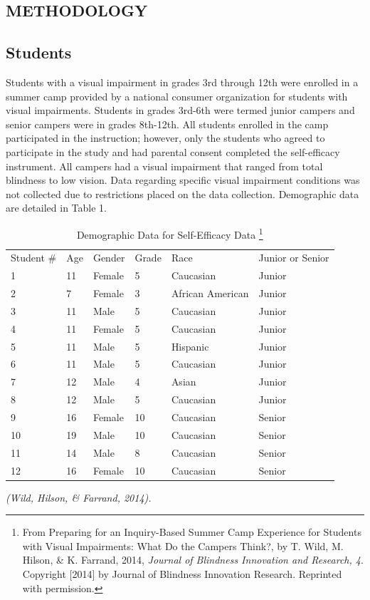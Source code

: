 \documentclass[11.5pt]{sig-alternate} %
\begin{document}
\begin{large}
\section*{METHODOLOGY}

\subsection*{Students}

Students with a visual impairment in grades 3rd through 12th were enrolled in a summer camp provided by a national consumer organization for students with visual impairments. Students in grades 3rd-6th were termed junior campers and senior campers were in grades 8th-12th. All students enrolled in the camp participated in the instruction; however, only the students who agreed to participate in the study and had parental consent completed the self-efficacy instrument. All campers had a visual impairment that ranged from total blindness to low vision.  Data regarding specific visual impairment conditions was not collected due to restrictions placed on the data collection. Demographic data are detailed in Table 1. 

\begin{table}[thp]
\caption{Demographic Data for Self-Efficacy Data \footnote{From Preparing for an Inquiry-Based Summer Camp Experience for Students with Visual Impairments: What Do the Campers Think?, by T. Wild, M. Hilson, \& K. Farrand, 2014, \textit{Journal of Blindness Innovation and Research, 4}.  Copyright [2014] by Journal of Blindness Innovation Research. Reprinted with permission.}}
\begin{tabular}{llllll}
\hline
Student \# & Age & Gender & Grade & Race & Junior or Senior \\
1 & 11 & Female & 5 & Caucasian & Junior \\
2 & 7 & Female & 3 & African American & Junior \\
3 & 11 & Male & 5 & Caucasian & Junior \\
4 & 11 & Female & 5 & Caucasian & Junior \\
5 & 11 & Male & 5 & Hispanic & Junior \\
6 & 11 & Male & 5 & Caucasian & Junior \\
7 & 12 & Male & 4 & Asian & Junior \\
8 & 12 & Male & 5 & Caucasian & Junior \\
9 & 16 & Female & 10 & Caucasian & Senior \\
10 & 19 & Male & 10 & Caucasian & Senior \\
11 & 14 & Male & 8 & Caucasian & Senior \\
12 & 16 & Female & 10 & Caucasian & Senior \\ \hline
\end{tabular}
\textit{(Wild, Hilson, \& Farrand, 2014).}
\end{table}


\end{large}
\end{document}
